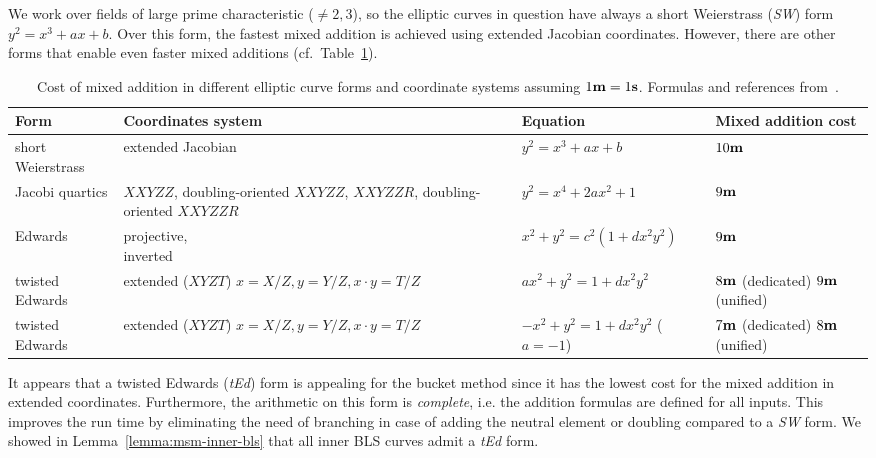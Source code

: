 \documentclass[journal=tches,spthm]{iacrtrans}
\newcommand{\bfm}{{\bf m}}
\newcommand{\bfs}{{\bf s}}
\begin{document}
We work over fields of large prime characteristic ($\ne 2, 3$), so the elliptic
curves in question have always a short Weierstrass (\textit{SW}) form $y^2=x^3+ax+b$. Over this
form, the fastest mixed addition is achieved using extended Jacobian
coordinates. However, there are other forms that enable even faster mixed
additions (cf.~Table~\ref{tab:curves-forms}).
%
\begin{table}[htb]
\begin{center}
\begin{tabular}{l|l|l|l}
    Form & Coordinates system & Equation & Mixed addition cost \\
    \hline
    short Weierstrass & extended Jacobian & $y^2=x^3+ax+b$ & $10\bfm$ \\
    \hline
    Jacobi quartics & \makecell[l]{$XXYZZ$, \\ doubling-oriented $XXYZZ$, \\ $XXYZZR$, \\ doubling-oriented $XXYZZR$} & $y^2=x^4+2ax^2+1$ & $9\bfm$ \\
    \hline
    Edwards & \makecell[l]{projective, \\ inverted} & $x^2+y^2=c^2(1+dx^2y^2)$ & $9\bfm$ \\
    \hline
    twisted Edwards & \makecell[l]{extended ($XYZT$) \\ $x=X/Z, y=Y/Z, x\cdot y=T/Z$} & $ax^2+y^2=1+dx^2y^2$ & \makecell[l]{$8\bfm$ (dedicated) \\ $9\bfm$ (unified)} \\
    \hline
    twisted Edwards & \makecell[l]{extended ($XYZT$) \\ $x=X/Z, y=Y/Z, x\cdot y=T/Z$} & \makecell[l]{$-x^2+y^2=1+dx^2y^2$ \\ ($a=-1$)} & \makecell[l]{$7\bfm$ (dedicated) \\ $8\bfm$ (unified)} \\
\end{tabular}
\end{center}
    \caption{Cost of mixed addition in different elliptic curve forms and coordinate systems assuming $1\bfm=1\bfs$. Formulas and references from~\cite{post:EFD}.}
\label{tab:curves-forms}
\end{table}

It appears that a twisted Edwards (\textit{tEd}) form is appealing for the bucket method
since it has the lowest cost for the mixed addition in extended coordinates.
Furthermore, the arithmetic on this form is \textit{complete}, i.e. the
addition formulas are defined for all inputs. This improves the run time by
eliminating the need of branching in case of adding the neutral element or
doubling compared to a \textit{SW} form. We showed in Lemma~\ref{lemma:msm-inner-bls} that
all inner BLS curves admit a \textit{tEd} form.
\end{document}
